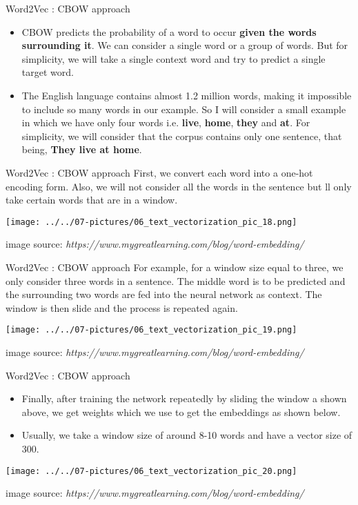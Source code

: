 \documentclass[11pt]{beamer}
\begin{document}
\begin{frame}{Word2Vec : CBOW approach}
	\begin{itemize}
		\item CBOW predicts the probability of a word to occur \textbf{given the words surrounding it}. We can consider a single word or a group of words. But for simplicity, we will take a single context word and try to predict a single target word.
		\item The English language contains almost 1.2 million words, making it impossible to include so many words in our example. So I will consider a small example in which we have only four words i.e. \textbf{live}, \textbf{home}, \textbf{they} and \textbf{at}. For simplicity, we will consider that the corpus contains only one sentence, that being, \textbf{They live at home}.
	\end{itemize}
\end{frame}
\begin{frame}{Word2Vec : CBOW approach}
	First, we convert each word into a one-hot encoding form. Also, we will not consider all the words in the sentence but ll only take certain words that are in a window. 
	\begin{center}
	\texttt{[image: ../../07-pictures/06\_text\_vectorization\_pic\_18.png]}
	\end{center}
	\footnotesize{image source: \textit{https://www.mygreatlearning.com/blog/word-embedding/}}
\end{frame}
\begin{frame}{Word2Vec : CBOW approach}
	For example, for a window size equal to three, we only consider three words in a sentence. The middle word is to be predicted and the surrounding two words are fed into the neural network as context. The window is then slide and the process is repeated again.
	\begin{center}
	\texttt{[image: ../../07-pictures/06\_text\_vectorization\_pic\_19.png]}
	\end{center}
	\footnotesize{image source: \textit{https://www.mygreatlearning.com/blog/word-embedding/}}
\end{frame}
\begin{frame}{Word2Vec : CBOW approach}
	\begin{itemize}
		\item Finally, after training the network repeatedly by sliding the window a shown above, we get weights which we use to get the embeddings as shown below.
		\item Usually, we take a window size of around 8-10 words and have a vector size of 300.
	\end{itemize}
	\begin{center}
	\texttt{[image: ../../07-pictures/06\_text\_vectorization\_pic\_20.png]}
	\end{center}
	\footnotesize{image source: \textit{https://www.mygreatlearning.com/blog/word-embedding/}}
\end{frame}
\end{document}
